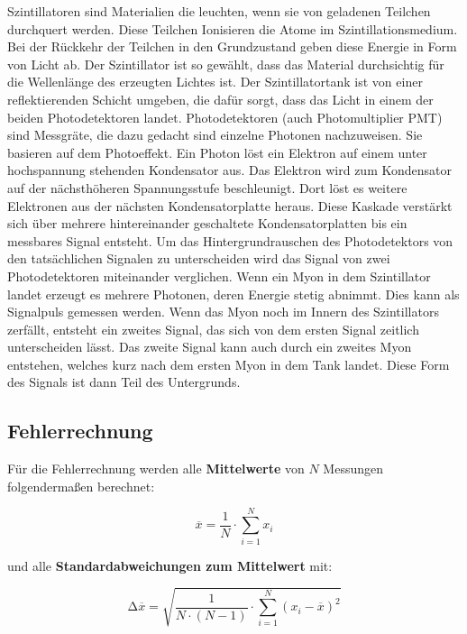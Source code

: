 Szintillatoren sind Materialien die leuchten, wenn sie von geladenen Teilchen durchquert werden.
Diese Teilchen Ionisieren die Atome im Szintillationsmedium. Bei der Rückkehr der Teilchen in den
Grundzustand geben diese Energie in Form von Licht ab. Der Szintillator ist so gewählt, dass das
Material durchsichtig für die Wellenlänge des erzeugten Lichtes ist.
Der Szintillatortank ist von einer reflektierenden Schicht umgeben, die dafür sorgt, dass das Licht in
einem der beiden Photodetektoren landet.
Photodetektoren (auch Photomultiplier PMT) sind Messgräte, die dazu gedacht sind einzelne Photonen nachzuweisen.
Sie basieren auf dem Photoeffekt. Ein Photon löst ein Elektron auf einem unter hochspannung stehenden Kondensator aus.
Das Elektron wird zum Kondensator auf der nächsthöheren Spannungsstufe beschleunigt. Dort löst es weitere Elektronen
aus der nächsten Kondensatorplatte heraus. Diese Kaskade verstärkt sich über mehrere hintereinander geschaltete Kondensatorplatten
bis ein messbares Signal entsteht. 
Um das Hintergrundrauschen des Photodetektors von den tatsächlichen Signalen zu unterscheiden wird das Signal von zwei Photodetektoren
miteinander verglichen.
Wenn ein Myon in dem Szintillator landet erzeugt es mehrere Photonen, deren Energie stetig abnimmt. 
Dies kann als Signalpuls gemessen werden. Wenn das Myon noch im Innern des Szintillators zerfällt, 
entsteht ein zweites Signal, das sich von dem ersten Signal zeitlich unterscheiden lässt.
Das zweite Signal kann auch durch ein zweites Myon entstehen, welches kurz nach dem ersten Myon
in dem Tank landet. Diese Form des Signals ist dann Teil des Untergrunds.


\subsection{Fehlerrechnung}
Für die Fehlerrechnung werden alle \textbf{Mittelwerte} von $N$ Messungen folgendermaßen berechnet:

\begin{equation}
	\overline{x} = \frac{1}{N} \cdot \sum_{i=1}^N x_i
	\label{eqn:Mittelwert}
\end{equation}

und alle \textbf{Standardabweichungen zum Mittelwert} mit:

\begin{equation}
	\increment\overline{x} = \sqrt{\frac{1}{N\cdot(N-1)}\cdot\sum_{i=1}^N (x_i-\overline{x})^2}
	\label{eqn:St_Mittelwert}
\end{equation}

